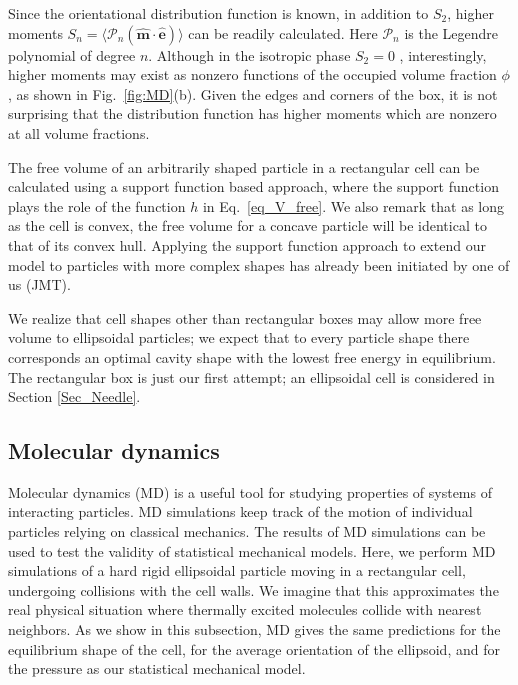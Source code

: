\documentclass{article}
\begin{document}
Since the orientational distribution function is known, in addition to $%
S_{2} $, higher moments $S_{n}=\langle \mathcal{P}_{n}(\mathbf{\hat{m}\cdot 
\hat{e}})\rangle $ can be readily calculated. Here $\mathcal{P}_n$ is the
Legendre polynomial of degree $n$. Although in the isotropic phase $S_{2}=0$%
, interestingly, higher moments may exist as nonzero functions of the
occupied volume fraction $\phi $, as shown in Fig.~\ref{fig:MD}(b). Given the edges and corners of the box, it
is not surprising that the distribution function has higher moments which
are nonzero at all volume fractions. 

The free volume of an arbitrarily shaped particle in a rectangular cell can
be calculated using a support function based approach, where the support
function plays the role of the function $h$ in Eq.~\eqref{eq_V_free}. We
also remark that as long as the cell is convex, the free volume for a
concave particle will be identical to that of its convex hull. Applying the
support function approach to extend our model to particles with more complex
shapes has already been initiated by one of us (JMT).

We realize that cell shapes other than rectangular boxes may allow more free
volume to ellipsoidal particles; we expect that to every particle shape
there corresponds an optimal cavity shape with the lowest free energy in
equilibrium. The rectangular box is just our first attempt; an ellipsoidal
cell is considered in Section \ref{Sec_Needle}.

\subsection{Molecular dynamics}

Molecular dynamics (MD) is a useful tool for studying properties of systems
of interacting particles. MD simulations keep track of the motion of
individual particles relying on classical mechanics. The results of MD
simulations can be used to test the validity of statistical mechanical
models. Here, we perform MD simulations of a hard rigid ellipsoidal particle
moving in a rectangular cell, undergoing collisions with the cell walls. We
imagine that this approximates the real physical situation where thermally
excited molecules collide with nearest neighbors. As we show in this
subsection, MD gives the same predictions for the equilibrium shape of the
cell, for the average orientation of the ellipsoid, and for the pressure as
our statistical mechanical model.
\end{document}
